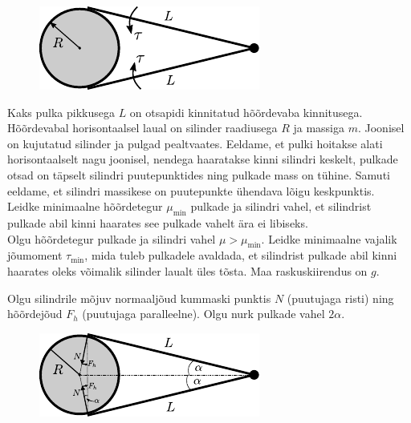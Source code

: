 \setAuthor{}

\begin{figure}
  \vspace{-8pt}
  \begin{center}
  \includegraphics[scale=0.9]{2020-v3g-07-yl.pdf}
  \end{center}
  \vspace{-25pt}
\end{figure}
Kaks pulka pikkusega $L$ on otsapidi kinnitatud hõõrdevaba kinnitusega.
Hõõrdevabal horisontaalsel laual on silinder raadiusega $R$ ja massiga $m$.
Joonisel on kujutatud silinder ja pulgad pealtvaates. Eeldame, et pulki hoitakse
alati horisontaalselt nagu joonisel, nendega haaratakse kinni silindri keskelt,
pulkade otsad on täpselt silindri puutepunktides ning pulkade mass on tühine.
Samuti eeldame, et silindri massikese on puutepunkte ühendava lõigu keskpunktis.\\
\osa Leidke minimaalne hõõrdetegur $\mu_{\min}$ pulkade ja silindri vahel,
et silindrist pulkade abil kinni haarates see pulkade vahelt ära ei libiseks.\\
\osa Olgu hõõrdetegur pulkade ja silindri vahel $\mu > \mu_{\min}$. Leidke
minimaalne vajalik jõumoment $\tau_{\min}$, mida tuleb pulkadele avaldada, et
silindrist pulkade abil kinni haarates oleks võimalik silinder laualt üles
tõsta. Maa raskuskiirendus on $g$.


\hint

\solu
\osa Olgu silindrile mõjuv normaaljõud kummaski punktis $N$ (puutujaga risti) ning hõõrdejõud $F_h$ (puutujaga paralleelne). Olgu nurk pulkade vahel $2\alpha$.

\begin{figure}[h]
\centering
\includegraphics[width=0.5\linewidth]{2020-v3g-07-sol.pdf}
\end{figure}

